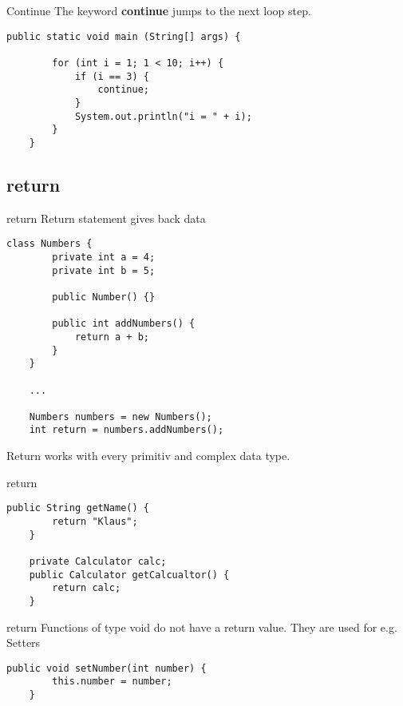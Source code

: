 \begin{frame}[fragile]{Continue}
    The keyword \textbf{continue} jumps to the next loop step.
    \begin{lstlisting}[basicstyle=\ttfamily\scriptsize]
    public static void main (String[] args) {
    
        for (int i = 1; 1 < 10; i++) {
            if (i == 3) {
                continue;
            }
            System.out.println("i = " + i);
        }
    }
    \end{lstlisting}
\end{frame}

\subsection{return}
\begin{frame}[fragile]{return}
    Return statement gives back data
    \begin{lstlisting}[basicstyle=\ttfamily\scriptsize]
    class Numbers {
        private int a = 4;
        private int b = 5;
        
        public Number() {}
        
        public int addNumbers() {
            return a + b;
        }
    }
    
    ...
    
    Numbers numbers = new Numbers();
    int return = numbers.addNumbers();
    \end{lstlisting}
    
    Return works with every primitiv and complex data type.
    
\end{frame}

\begin{frame}[fragile]{return}
    \begin{lstlisting}[basicstyle=\ttfamily\scriptsize]
    public String getName() {
        return "Klaus";
    }
    
    private Calculator calc;
    public Calculator getCalcualtor() {
        return calc;
    }
    \end{lstlisting}
\end{frame}

\begin{frame}[fragile]{return}
    Functions of type void do not have a return value.
    They are used for e.g. Setters
    \begin{lstlisting}[basicstyle=\ttfamily\scriptsize]
    public void setNumber(int number) {
        this.number = number;
    }
    \end{lstlisting}
\end{frame}


